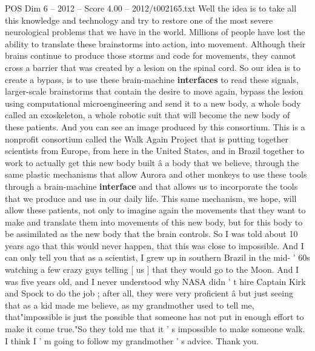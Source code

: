 \begin{textsample}{POS Dim 6 – 2012 – Score 4.00 – 2012/t002165.txt}
Well the idea is to take all this knowledge and technology and try to restore one of the most severe neurological problems that we have in the world.
Millions of people have lost the ability to translate these brainstorms into action, into movement.
Although their brains continue to produce those storms and code for movements, they cannot cross a barrier that was created by a lesion on the spinal cord.
So our idea is to create a bypass, is to use these brain-machine \textbf{interfaces} to read these signals, larger-scale brainstorms that contain the desire to move again, bypass the lesion using computational microengineering and send it to a new body, a whole body called an exoskeleton, a whole robotic suit that will become the new body of these patients.
And you can see an image produced by this consortium.
This is a nonprofit consortium called the Walk Again Project that is putting together scientists from Europe, from here in the United States, and in Brazil together to work to actually get this new body built â a body that we believe, through the same plastic mechanisms that allow Aurora and other monkeys to use these tools through a brain-machine \textbf{interface} and that allows us to incorporate the tools that we produce and use in our daily life.
This same mechanism, we hope, will allow these patients, not only to imagine again the movements that they want to make and translate them into movements of this new body, but for this body to be assimilated as the new body that the brain controls.
So I was told about 10 years ago that this would never happen, that this was close to impossible.
And I can only tell you that as a scientist, I grew up in southern Brazil in the mid- ' 60s watching a few crazy guys telling [ us ] that they would go to the Moon.
And I was five years old, and I never understood why NASA didn ' t hire Captain Kirk and Spock to do the job ; after all, they were very proficient â but just seeing that as a kid made me believe, as my grandmother used to tell me, that"impossible is just the possible that someone has not put in enough effort to make it come true."So they told me that it ' s impossible to make someone walk.
I think I ' m going to follow my grandmother ' s advice.
Thank you.

\end{textsample}
